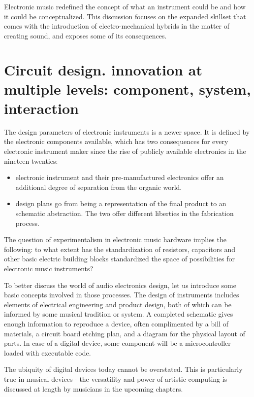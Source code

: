 	Electronic music redefined the concept of what an instrument could be and how it could be conceptualized. This discussion focuses on the expanded skillset that comes with the introduction of electro-mechanical hybrids in the matter of creating sound, and exposes some of its consequences. 

\section{Circuit design. innovation at multiple levels: component, system, interaction}

The design parameters of electronic instruments is a newer space. It is defined by the electronic components available, which has two consequences for every electronic instrument maker since the rise of publicly available electronics in the nineteen-twenties:

\begin{itemize}
	\item electronic instrument and their pre-manufactured electronics offer an additional degree of separation from the organic world. 
	\item design plans go from being a representation of the final product to an schematic abstraction. The two offer different liberties in the fabrication process.
\end{itemize}
	
The question of experimentalism in electronic music hardware implies the following: to what extent has the standardization of resistors, capacitors and other basic electric building blocks standardized the space of possibilities for electronic music instruments? 

To better discuss the world of audio electronics design, let us introduce some basic concepts involved in those processes. The design of instruments includes elements of electrical engineering and product design, both of which can be informed by some musical tradition or system. A completed schematic gives enough information to reproduce a device, often complimented by a bill of materials, a circuit board etching plan, and a diagram for the physical layout of parts. In case of a digital device, some component will be a microcontroller loaded with executable code. 

The ubiquity of digital devices today cannot be overstated. This is particularly true in musical devices - the versatility and power of artistic computing is discussed at length by musicians in the upcoming chapters. 

